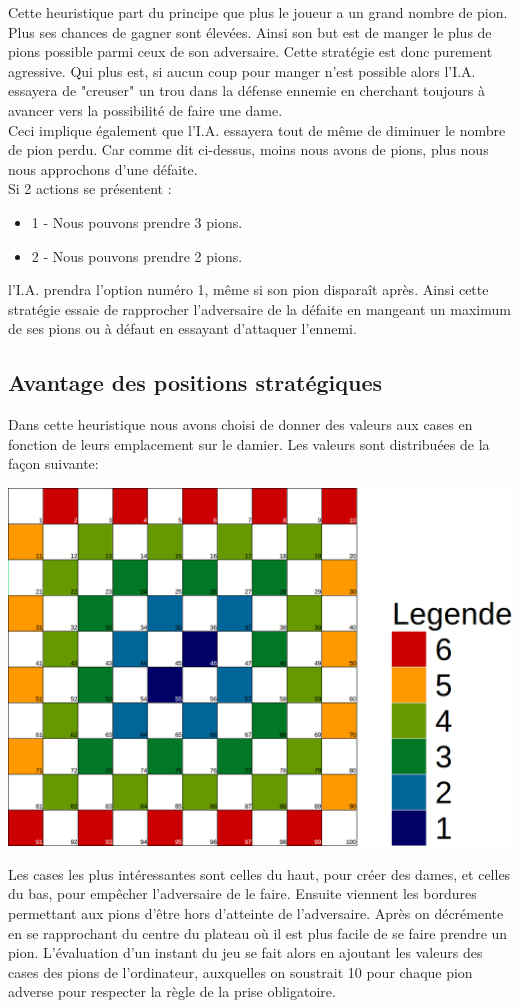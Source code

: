 \documentclass[10pt,a4paper]{report}
\begin{document}
	Cette heuristique part du principe que plus le joueur a un grand nombre de pion. Plus ses chances de gagner sont élevées. Ainsi son but est de manger le plus de pions possible parmi ceux de son adversaire.
	Cette stratégie est donc purement agressive. Qui plus est, si aucun coup pour manger n'est possible alors l'I.A. essayera de "creuser" un trou dans la défense ennemie en cherchant toujours à avancer vers la possibilité de faire une dame. \\
	
	Ceci implique également que l'I.A. essayera tout de même de diminuer le nombre de pion perdu.
	Car comme dit ci-dessus, moins nous avons de pions, plus nous nous approchons d'une défaite. \\
	
	Si 2 actions se présentent : 
	\begin{itemize}
		\item 1 - Nous pouvons prendre 3 pions.
		\item 2 - Nous pouvons prendre 2 pions.
	\end{itemize}
	l'I.A. prendra l'option numéro 1, même si son pion disparaît après.
	Ainsi cette stratégie essaie de rapprocher l'adversaire de la défaite en mangeant un maximum de ses pions ou à défaut en essayant d'attaquer l'ennemi.
	\subsection{Avantage des positions stratégiques}
		Dans cette heuristique nous avons choisi de donner des valeurs aux cases en fonction de leurs emplacement sur le damier. Les valeurs sont distribuées de la façon suivante:
		\begin{center}
			\includegraphics[scale=0.2]{valeursDamier.png}
		\end{center}
		Les cases les plus intéressantes sont celles du haut, pour créer des dames, et celles du bas, pour empêcher l'adversaire de le faire. Ensuite viennent les bordures permettant aux pions d'être hors d'atteinte de l'adversaire. Après on décrémente en se rapprochant du centre du plateau où il est plus facile de se faire prendre un pion.
		L'évaluation d'un instant du jeu se fait alors en ajoutant les valeurs des cases des pions de l'ordinateur, auxquelles on soustrait 10 pour chaque pion adverse pour respecter la règle de la prise obligatoire.
\end{document}
